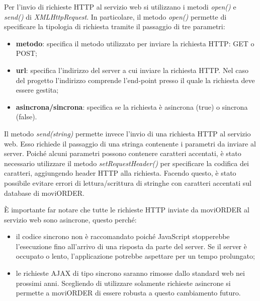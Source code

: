 Per l'invio di richieste HTTP al servizio web si utilizzano i metodi \textit{open()} e \textit{send()} di \textit{XMLHttpRequest}. In particolare, il metodo \textit{open()} permette di specificare la tipologia di richiesta tramite il passaggio di tre parametri:
	\begin{itemize}
		\item \textbf{metodo}: specifica il metodo utilizzato per inviare la richiesta HTTP: GET o POST;
		\item \textbf{url}: specifica l'indirizzo del server a cui inviare la richiesta HTTP. Nel caso del progetto l'indirizzo comprende l'end-point presso il quale la richiesta deve essere gestita;
		\item \textbf{asincrona/sincrona}: specifica se la richiesta è asincrona (true) o sincrona (false).
	\end{itemize}
Il metodo \textit{send(string)} permette invece l'invio di una richiesta HTTP al servizio web. Esso richiede il passaggio di una stringa contenente i parametri da inviare al server. Poiché alcuni parametri possono contenere caratteri accentati, è stato necessario utilizzare il metodo \textit{setRequestHeader()} per specificare la codifica dei caratteri, aggiungendo header HTTP alla richiesta. Facendo questo, è stato possibile evitare errori di lettura/scrittura di stringhe con caratteri accentati sul database di moviORDER. 

È importante far notare che tutte le richieste HTTP inviate da moviORDER al servizio web sono asincrone, questo perché:
\begin{itemize}
	\item il codice sincrono non è raccomandato poiché JavaScript stopperebbe l'esecuzione fino all'arrivo di una risposta da parte del server. Se il server è occupato o lento, l'applicazione potrebbe aspettare per un tempo prolungato;
	\item le richieste AJAX di tipo sincrono saranno rimosse dallo standard web nei prossimi anni. Scegliendo di utilizzare solamente richieste asincrone si permette a moviORDER di essere robusta a questo cambiamento futuro.
\end{itemize} 

